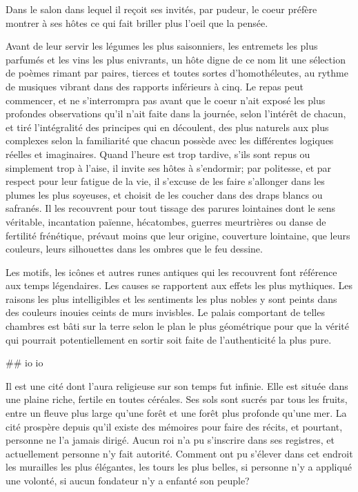 Dans le salon dans lequel il reçoit ses invités, par pudeur, le coeur
préfère montrer à ses hôtes ce qui fait briller plus l'oeil que la pensée.

Avant de leur servir les légumes les plus saisonniers, les entremets
les plus parfumés et les vins les plus enivrants, un hôte digne de ce
nom lit une sélection de poèmes rimant par paires, tierces et toutes
sortes d'homothéleutes, au rythme de musiques vibrant dans des
rapports inférieurs à cinq. Le repas peut commencer, et ne
s'interrompra pas avant que le coeur n'ait exposé les plus profondes
observations qu'il n'ait faite dans la journée, selon l'intérêt de
chacun, et tiré l'intégralité des principes qui en découlent, des plus
naturels aux plus complexes selon la familiarité que chacun possède
avec les différentes logiques réelles et imaginaires. Quand l'heure
est trop tardive, s'ils sont repus ou simplement trop à l'aise, il
invite ses hôtes à s'endormir; par politesse, et par respect pour leur
fatigue de la vie, il s'excuse de les faire s'allonger dans les plumes
les plus soyeuses, et choisit de les coucher dans des draps blancs ou
safranés. Il les recouvrent pour tout tissage des parures lointaines
dont le sens véritable, incantation païenne, hécatombes, guerres
meurtrières ou danse de fertilité frénétique, prévaut moins que leur
origine, couverture lointaine, que leurs couleurs, leurs silhouettes
dans les ombres que le feu dessine.

Les motifs, les icônes et autres runes antiques qui les recouvrent
font référence aux temps légendaires. Les causes se rapportent aux
effets les plus mythiques. Les raisons les plus intelligibles et les
sentiments les plus nobles y sont peints dans des couleurs inouies
ceints de murs invisbles. Le palais comportant de telles chambres est
bâti sur la terre selon le plan le plus géométrique pour que la vérité
qui pourrait potentiellement en sortir soit faite de l'authenticité la
plus pure.

## io io

Il est une cité dont l'aura religieuse sur son temps fut infinie. Elle
est située dans une plaine riche, fertile en toutes céréales. Ses sols
sont sucrés par tous les fruits, entre un fleuve plus large qu'une
forêt et une forêt plus profonde qu'une mer. La cité prospère depuis
qu'il existe des mémoires pour faire des récits, et pourtant, personne
ne l'a jamais dirigé. Aucun roi n'a pu s'inscrire dans ses registres,
et actuellement personne n'y fait autorité. Comment ont pu s'élever
dans cet endroit les murailles les plus élégantes, les tours les plus
belles, si personne n'y a appliqué une volonté, si aucun fondateur n'y
a enfanté son peuple?


